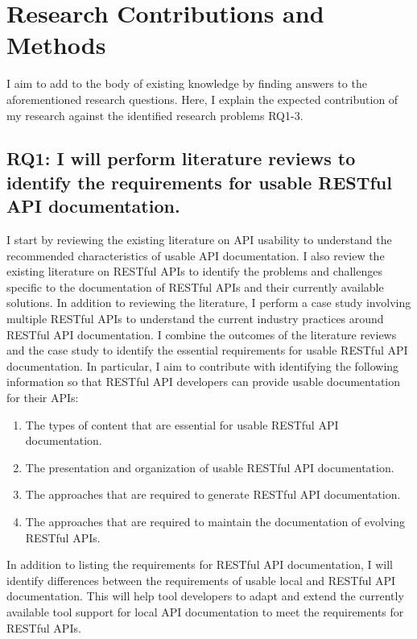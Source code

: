 \documentclass[11pt,oneside]{book}
\begin{document}
\chapter{Research Contributions and Methods}

I aim to add to the body of existing knowledge by finding answers to the aforementioned research questions. Here, I explain the expected contribution of my research against the identified research problems RQ1-3.

\section{RQ1: I will perform literature reviews to identify the requirements for usable RESTful API documentation.}

I start by reviewing the existing literature on API usability to understand the recommended characteristics of usable API documentation. I also review the existing literature on RESTful APIs to identify the problems and challenges specific to the documentation of RESTful APIs and their currently available solutions. In addition to reviewing the literature, I perform a case study involving multiple RESTful APIs to understand the current industry practices around RESTful API documentation. I combine the outcomes of the literature reviews and the case study to identify the essential requirements for usable RESTful API documentation. In particular, I aim to contribute with identifying the following information so that RESTful API developers can provide usable documentation for their APIs:

\begin{enumerate}
\item The types of content that are essential for usable RESTful API documentation.
\item The presentation and organization of usable RESTful API documentation.
\item The approaches that are required to generate RESTful API documentation.
\item The approaches that are required to maintain the documentation of evolving RESTful APIs.
\end{enumerate}

In addition to listing the requirements for RESTful API documentation, I will identify differences between the requirements of usable local and RESTful API documentation. This will help tool developers to adapt and extend the currently available tool support for local API documentation to meet the requirements for RESTful APIs.
\end{document}

